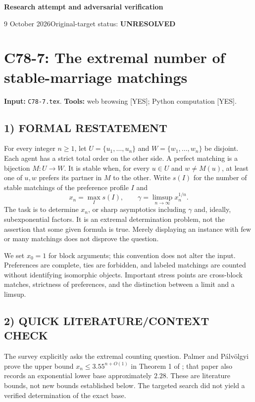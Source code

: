 \documentclass[11pt,a4paper]{article}
\theoremstyle{definition}
\theoremstyle{remark}
\begin{document}
{\large\bfseries Research attempt and adversarial verification}\par
9 October 2026\hfill Original-target status: \textbf{UNRESOLVED}\par
\section{C78-7: The extremal number of stable-marriage matchings}
\label{sec:C78-7}
\noindent\textbf{Input:} \texttt{C78-7.tex}. \quad\textbf{Tools:} web browsing [YES]; Python computation [YES].

\subsection*{1) FORMAL RESTATEMENT}
For every integer $n\geq1$, let $U=\{u_1,\ldots,u_n\}$ and
$W=\{w_1,\ldots,w_n\}$ be disjoint. Each agent has a strict total order on the other side.
A perfect matching is a bijection $M:U\to W$. It is stable when, for every
$u\in U$ and $w\ne M(u)$, at least one of $u,w$ prefers its partner in $M$ to the other.
Write $s(I)$ for the number of stable matchings of the preference profile $I$ and
\[
 x_n=\max_I s(I),\qquad \gamma=\limsup_{n\to\infty}x_n^{1/n}.
\]
The task is to determine $x_n$, or sharp asymptotics including $\gamma$ and, ideally,
subexponential factors. It is an extremal determination problem, not the assertion
that some given formula is true. Merely displaying an instance with few or many
matchings does not disprove the question.

We set $x_0=1$ for block arguments; this convention does not alter the input.
Preferences are complete, ties are forbidden, and labeled matchings are counted
without identifying isomorphic objects. Important stress points are cross-block
matches, strictness of preferences, and the distinction between a limit and a limsup.

\subsection*{2) QUICK LITERATURE/CONTEXT CHECK}
The survey \cite{matching-survey} explicitly asks the extremal counting question.
Palmer and P\'alv\"olgyi prove the upper bound $x_n\leq 3.55^{n+O(1)}$
in Theorem 1 of \cite{palmer}; that paper also records an exponential lower base
approximately $2.28$. These are literature bounds, not new bounds established below.
The targeted search did not yield a verified determination of the exact base.
\end{document}
